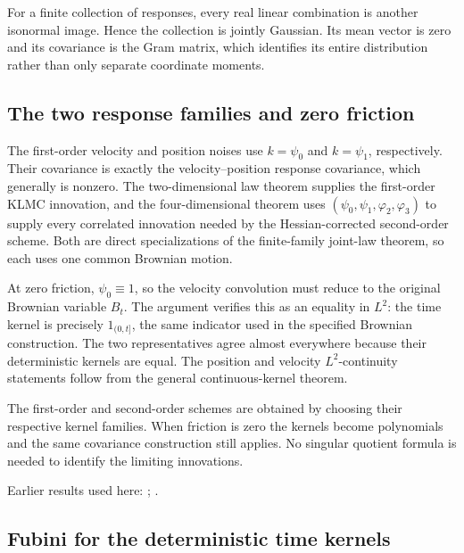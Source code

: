 \documentclass[11pt,a4paper]{report}
\begin{document}
For a finite collection of responses, every real linear combination is another isonormal image. Hence the collection is jointly Gaussian. Its mean vector is zero and its covariance is the Gram matrix, which identifies its entire distribution rather than only separate coordinate moments.

\subsection{\texorpdfstring{The two response families and zero friction}{The two response families and zero friction}}
\label{report-step-KineticLangevin-BrownianConvolution-lean-7}


The first-order velocity and position noises use \(k=\psi_0\) and \(k=\psi_1\), respectively. Their covariance is exactly the velocity–position response covariance, which generally is nonzero. The two-dimensional law theorem supplies the first-order KLMC innovation, and the four-dimensional theorem uses \((\psi_0,\psi_1,\varphi_2,\varphi_3)\) to supply every correlated innovation needed by the Hessian-corrected second-order scheme. Both are direct specializations of the finite-family joint-law theorem, so each uses one common Brownian motion.



At zero friction, \(\psi_0\equiv1\), so the velocity convolution must reduce to the original Brownian variable \(B_t\). The argument verifies this as an equality in \(L^{2}\): the time kernel is precisely \(1_{(0,t]}\), the same indicator used in the specified Brownian construction. The two representatives agree almost everywhere because their deterministic kernels are equal. The position and velocity \(L^{2}\)-continuity statements follow from the general continuous-kernel theorem.



The first-order and second-order schemes are obtained by choosing their respective kernel families. When friction is zero the kernels become polynomials and the same covariance construction still applies. No singular quotient formula is needed to identify the limiting innovations.



Earlier results used here: \cite[Section~3.8.2]{LangevinLean2026ULASC}; \cite[Section~3.8.9]{LangevinLean2026ULASC}.
\subsection{\texorpdfstring{Fubini for the deterministic time kernels}{Fubini for the deterministic time kernels}}
\label{report-step-KineticLangevin-BrownianConvolution-lean-8}
\end{document}
